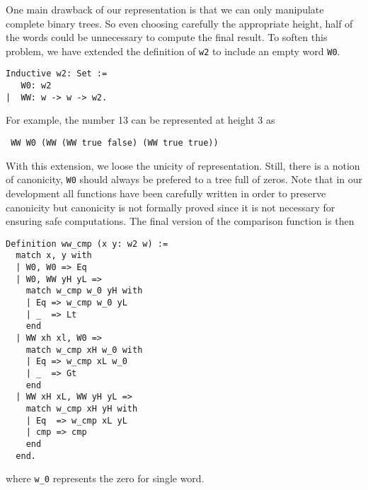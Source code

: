 One main drawback of our representation is that we can only manipulate
complete binary trees. So even choosing
carefully the appropriate height, half of the words could be unnecessary 
to compute the final result. 
To soften this problem, we have extended the definition of {\tt w2} to include an
empty word {\tt W0}. 
\begin{verbatim}
Inductive w2: Set :=  
   W0: w2
|  WW: w -> w -> w2.
\end{verbatim}
For example, the number 13 can be represented at height 3 as
\begin{verbatim}
 WW W0 (WW (WW true false) (WW true true))
\end{verbatim}
With this extension, we loose the unicity of representation. Still, there is a notion
of canonicity, {\tt W0} should always be prefered to a tree full of zeros. Note that in
our development all functions have been carefully written in order to preserve canonicity but
canonicity  is not formally proved since it is not necessary for ensuring safe computations.
The final version of the comparison function is then
\begin{verbatim}
Definition ww_cmp (x y: w2 w) :=
  match x, y with
  | W0, W0 => Eq
  | W0, WW yH yL =>
    match w_cmp w_0 yH with
    | Eq => w_cmp w_0 yL
    | _  => Lt
    end
  | WW xh xl, W0 =>
    match w_cmp xH w_0 with
    | Eq => w_cmp xL w_0
    | _  => Gt
    end
  | WW xH xL, WW yH yL =>
    match w_cmp xH yH with
    | Eq  => w_cmp xL yL
    | cmp => cmp
    end
  end.
\end{verbatim}
where {\tt w\_0} represents the zero for single word.

